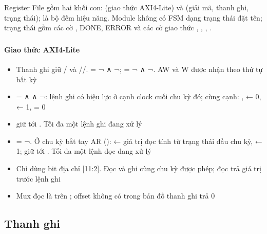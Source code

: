 \documentclass[10pt,a4paper]{article}
\begin{document}
Register File gồm hai khối con:  (giao thức AXI4-Lite) và  (giải mã, thanh ghi, trạng thái);  là bộ đếm hiệu năng. Module không có FSM dạng trạng thái đặt tên; trạng thái gồm các cờ , DONE, ERROR và các cờ giao thức , , , .

\subsubsection{\texorpdfstring{}{gemm\_axil\_slave}}

\paragraph{Giao thức AXI4-Lite}\label{par:4-1}
\begin{itemize}
\item Thanh ghi giữ / và //.  = ¬ ∧ ¬;  = ¬ ∧ ¬. AW và W được nhận theo thứ tự bất kỳ
\item {} =  ∧  ∧ ¬: lệnh ghi có hiệu lực ở cạnh clock cuối chu kỳ đó; cùng cạnh: ,  ← 0,  ← 1,  = 0
\item {} giữ tới . Tối đa một lệnh ghi đang xử lý
\item {} = ¬. Ở chu kỳ bắt tay AR ():  ← giá trị đọc tính từ trạng thái đầu chu kỳ,  ← 1; giữ tới . Tối đa một lệnh đọc đang xử lý
\item Chỉ dùng bit địa chỉ [11:2]. Đọc và ghi cùng chu kỳ được phép; đọc trả giá trị trước lệnh ghi
\item Mux đọc là  trên ; offset không có trong bản đồ thanh ghi trả 0
\end{itemize}

\subsection{Thanh ghi}\label{sec:5}
\end{document}
